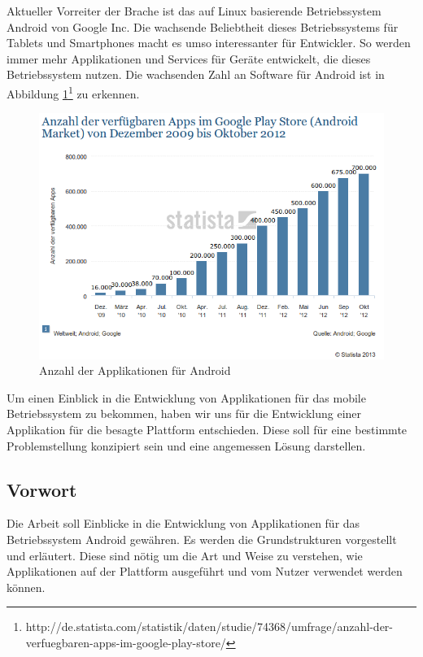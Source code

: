 Aktueller Vorreiter der Brache ist das auf Linux basierende Betriebssystem Android von Google Inc. Die wachsende Beliebtheit dieses Betriebssystems für Tablets und Smartphones macht es umso interessanter für Entwickler. So werden immer mehr Applikationen und Services für Geräte entwickelt, die dieses Betriebssystem nutzen. Die wachsenden Zahl an Software für Android ist in Abbildung \ref*{androidmarket}\footnote{http://de.statista.com/statistik/daten/studie/74368/umfrage/anzahl-der-verfuegbaren-apps-im-google-play-store/} zu erkennen. 

\begin{figure}[h!t]
\begin{center}
\includegraphics[scale=0.6]{images/androidmarket}
\caption{Anzahl der Applikationen für Android}
\label{androidmarket}
\end{center}
\end{figure}

Um einen Einblick in die Entwicklung von Applikationen für das mobile Betriebssystem zu bekommen, haben wir uns für die Entwicklung einer Applikation für die besagte Plattform entschieden. Diese soll für eine bestimmte Problemstellung konzipiert sein und eine angemessen Lösung darstellen.

\subsection{Vorwort}

Die Arbeit soll Einblicke in die Entwicklung von Applikationen für das Betriebssystem Android gewähren. Es werden die Grundstrukturen vorgestellt und erläutert. Diese sind nötig um die Art und Weise zu verstehen, wie Applikationen auf der Plattform ausgeführt und vom Nutzer verwendet werden können.

